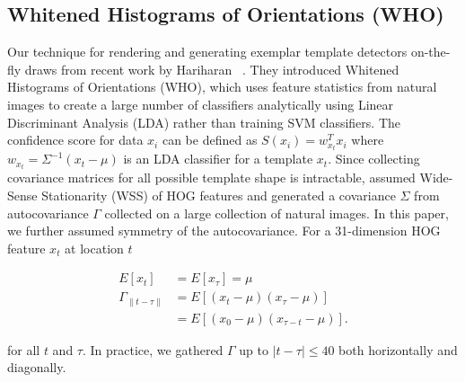 \subsection{Whitened Histograms of Orientations (WHO)}
\label{sec:who}
Our technique for rendering and generating exemplar template detectors
on-the-fly draws from recent work by Hariharan \etal~\cite{Hariharan12}. They introduced Whitened
Histograms of Orientations (WHO), which uses feature statistics from natural
images to create a large number of classifiers analytically using Linear
Discriminant Analysis (LDA) rather than training SVM
classifiers. The confidence score for data $x_i$ can be
defined as $ S(x_i) = w_{x_t}^T x_i$ where $w_{x_t} = \Sigma^{-1} (x_t - \mu)$
is an LDA classifier for a template $x_t$. Since collecting covariance matrices
for all possible template shape is intractable, \cite{Hariharan12} assumed
Wide-Sense Stationarity (WSS) of HOG features and generated a covariance
$\Sigma$ from autocovariance $\Gamma$ collected on a large collection of
natural images. In this paper, we further assumed symmetry of the
autocovariance. For a 31-dimension HOG feature $x_t$ at location $t$

\begin{align}
    E[x_t] & = E[x_\tau] = \mu\\
    \Gamma_{\|t - \tau\|} & = E[(x_{t} - \mu ) (x_{\tau} - \mu)] \\
              & = E[(x_0 - \mu)(x_{\tau - t} - \mu)].
\end{align}

for all $t$ and $\tau$. In practice, we gathered $\Gamma$ up to $|t - \tau |
\le 40$ both horizontally and diagonally.



% 
% 



